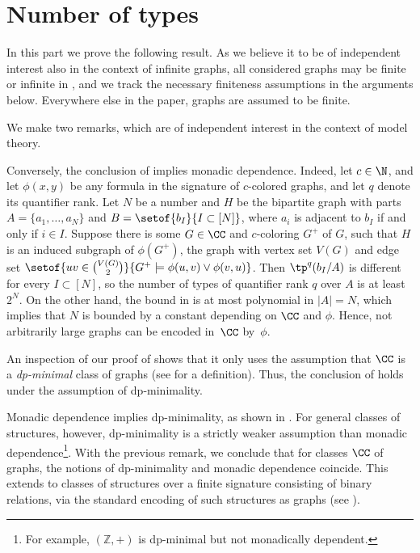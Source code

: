 \part{Number of types}\label{part:types}
In this part we prove the following result.
As we believe it to be of independent interest also in the context of infinite graphs,
all considered graphs may be finite or infinite in ,
and we track the necessary finiteness assumptions in the arguments below.
Everywhere else in the paper, graphs are assumed to be finite.

{\typeboundgeneraltrue\thmtypes*}

We make two remarks, which are of independent interest in the context of model theory.
\begin{remark}\label{rem:converse}
Conversely, the conclusion of  implies monadic dependence.
Indeed, let $c\in\N$, and let $\phi(x,y)$ be any formula in the signature of $c$-colored graphs, and let $q$ denote its quantifier rank. Let $N$ be a number and $H$ be the bipartite graph with parts $A=\{a_1,\ldots,a_N\}$ and $B=\setof{b_I}{I\subset [N]}$, where $a_i$ is adjacent to $b_I$ if and only if $i\in I$. Suppose there is some $G\in\CC$ and $c$-coloring $G^+$ of $G$, such that $H$ is an induced subgraph of $\phi(G^+)$, the graph with vertex set $V(G)$ and edge set $\setof{uv\in {V(G)\choose 2}}{G^+\models \phi(u,v)\lor \phi(v,u)}$. Then $\tp^q(b_I/A)$ is different for every $I\subset [N]$,
so the number of types of quantifier rank $q$ over $A$ is at least $2^N$.
On the other hand, the bound in  is at most polynomial in $|A|=N$, which implies that $N$ is bounded by a constant depending on $\CC$ and $\phi$.
Hence, not arbitrarily large graphs can be encoded in~$\CC$ by~$\phi$.
\end{remark}

\begin{remark}
     An inspection of our proof of  shows that it only uses the assumption that $\CC$ is a \emph{dp-minimal} class of graphs (see  for a definition).
    Thus, the conclusion of  holds under the assumption of dp-minimality.

    Monadic dependence implies dp-minimality, as shown in .
    For general classes of structures, however, dp-minimality is a strictly weaker assumption than monadic dependence\footnote{For example, $(\mathbb Z,+)$ is dp-minimal \cite[paragraph before Proposition 6.6]{ADHMS2016} but not monadically dependent.}.
     With the previous remark, we conclude that for classes $\CC$ of graphs, the notions of dp-minimality and monadic dependence coincide. This extends to classes of structures over a finite  signature consisting of binary relations, via the standard encoding of such structures as graphs (see \cite[full version, Section 19]{flip-breakability}).
\end{remark}

